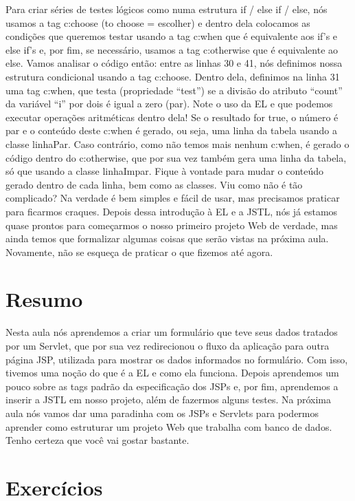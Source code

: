 Para criar séries de testes lógicos como numa estrutura if / else if / else, nós usamos a tag c:choose (to choose = escolher) e dentro dela colocamos as condições que queremos testar usando a tag c:when que é equivalente aos if’s e else if’s e, por fim, se necessário, usamos a tag c:otherwise que é equivalente ao else. Vamos analisar o código então: entre as linhas 30 e 41, nós definimos nossa estrutura condicional usando a tag c:choose. Dentro dela, definimos na linha 31 uma tag c:when, que testa (propriedade “test”) se a divisão do atributo “count” da variável “i” por dois é igual a zero (par). Note o uso da EL e que podemos executar operações aritméticas dentro dela! Se o resultado for true, o número é par e o conteúdo deste c:when é gerado, ou seja, uma linha da tabela usando a classe linhaPar. Caso contrário, como não temos mais nenhum c:when, é gerado o código dentro do c:otherwise, que por sua vez também gera uma linha da tabela, só que usando a classe linhaImpar. Fique à vontade para mudar o conteúdo gerado dentro de cada linha, bem como as classes.
Viu como não é tão complicado? Na verdade é bem simples e fácil de usar, mas precisamos praticar para ficarmos craques. Depois dessa introdução à EL e a JSTL, nós já estamos quase prontos para começarmos o nosso primeiro projeto Web de verdade, mas ainda temos que formalizar algumas coisas que serão vistas na próxima aula. Novamente, não se esqueça de praticar o que fizemos até agora.  


\section{Resumo}

Nesta aula nós aprendemos a criar um formulário que teve seus dados tratados por um Servlet, que por sua vez redirecionou o fluxo da aplicação para outra página JSP, utilizada para mostrar os dados informados no formulário. Com isso, tivemos uma noção do que é a EL e como ela funciona. Depois aprendemos um pouco sobre as tags padrão da especificação dos JSPs e, por fim, aprendemos a inserir a JSTL em nosso projeto, além de fazermos alguns testes. Na próxima aula nós vamos dar uma paradinha com os JSPs e Servlets para podermos aprender como estruturar um projeto Web que trabalha com banco de dados. Tenho certeza que você vai gostar bastante.


\section{Exercícios}

